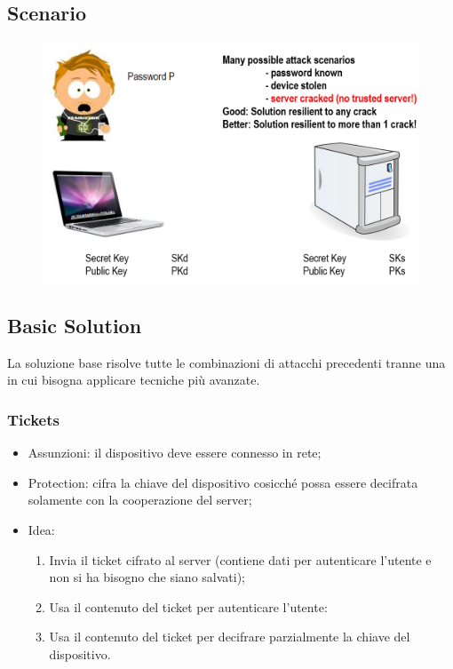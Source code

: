 \documentclass{book}
\begin{document}
\subsection{Scenario}
\begin{figure}[h]
    \centering
    \includegraphics[scale=0.5]{2022-01-06-16-43-18.png}%
\end{figure}
\subsection{Basic Solution}
La soluzione base risolve tutte le combinazioni di attacchi precedenti tranne una in cui bisogna applicare tecniche più avanzate.
\subsubsection{Tickets}
\begin{itemize}
    \item Assunzioni: il dispositivo deve essere connesso in rete;
    \item Protection: cifra la chiave del dispositivo cosicché possa essere decifrata solamente con la cooperazione del server;
    \item Idea: \begin{enumerate}
        \item Invia il ticket cifrato al server (contiene dati per autenticare l'utente e non si ha bisogno che siano salvati);
        \item Usa il contenuto del ticket per autenticare l'utente:
        \item Usa il contenuto del ticket per decifrare parzialmente la chiave del dispositivo.
    \end{enumerate}
\end{itemize}
\end{document}
